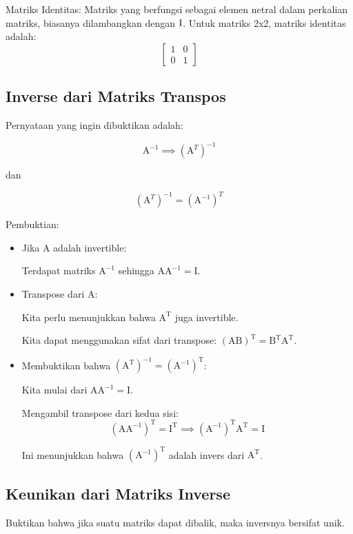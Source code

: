 \documentclass{article}
\begin{document}
Matriks Identitas: Matriks yang berfungsi sebagai elemen netral dalam perkalian matriks, biasanya dilambangkan dengan \( \rm I \). Untuk matriks 2x2, matriks identitas adalah: \[ \begin{bmatrix} 1 & 0 \\ 0 & 1 \end{bmatrix} \]

\subsection{Inverse dari Matriks Transpos}
Pernyataan yang ingin dibuktikan adalah:

\[
    \text{A}^{-1} \implies (\text{A}^{T})^{-1}
\]

dan

\[
    (\text{A}^{T})^{-1} = (\text{A}^{-1})^{T}
\]

Pembuktian:
\begin{itemize}
    \item Jika \( \text{A} \) adalah invertible:

          Terdapat matriks \( \text{A}^{-1} \) sehingga \( \text{A} \text{A}^{-1} = \text{I} \).
    \item Transpose dari \( \text{A} \):

          Kita perlu menunjukkan bahwa \( \text{A}^{\text{T}} \) juga invertible.

          Kita dapat menggunakan sifat dari transpose: \( (\text{A} \text{B})^{\text{T}} = \text{B}^{\text{T}} \text{A}^{\text{T}} \).

    \item Membuktikan bahwa \( (\text{A}^{\text{T}})^{-1} = (\text{A}^{-1})^{\text{T}} \):

          Kita mulai dari \( \text{A} \text{A}^{-1} = \text{I} \).

          Mengambil transpose dari kedua sisi: \[ (\text{A} \text{A}^{-1})^{\text{T}} = \text{I}^{\text{T}} \implies (\text{A}^{-1})^{\text{T}} \text{A}^{\text{T}} = \text{I} \]

          Ini menunjukkan bahwa \( (\text{A}^{-1})^{\text{T}} \) adalah invers dari \( \text{A}^{\text{T}} \).
\end{itemize}

\subsection{Keunikan dari Matriks Inverse}
Buktikan bahwa jika suatu matriks dapat dibalik, maka inversnya bersifat unik.
\end{document}
